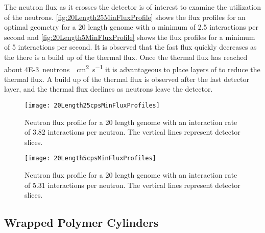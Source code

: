 The neutron flux as it crosses the detector is of interest to examine the utilization of the neutrons.
\autoref{fig:20Length25MinFluxProfile} shows the flux profiles for an optimal geometry for a 20 length genome with a minimum of 2.5 interactions per second and \autoref{fig:20Length5MinFluxProfile} shows the flux profiles for a minimum of 5 interactions per second.
It is observed that the fast flux quickly decreases as the there is a build up of the thermal flux.
Once the thermal flux has reached about \SI{4E-3}{neutrons \per \cm\squared \per\second} it is advantageous to place layers of  to reduce the thermal flux.
A build up of the thermal flux is observed after the last detector layer, and the thermal flux declines as neutrons leave the detector.
\begin{figure}
	\centering
	\texttt{[image: 20Length25cpsMinFluxProfiles]}
	\caption[Neutron Flux Profile for an Optimal 20 Length Genome, minimum 2.5 interactions per second]{Neutron flux profile for a 20 length genome with an interaction rate of 3.82 interactions per neutron. The vertical lines represent detector slices.}
	\label{fig:20Length25MinFluxProfile}
\end{figure}
\begin{figure}
	\centering
	\texttt{[image: 20Length5cpsMinFluxProfiles]}
	\caption[Neutron Flux Profile for an Optimal 20 Length Genome, minimum 5 interactions per second]{Neutron flux profile for a 20 length genome with an interaction rate of 5.31 interactions per neutron. The vertical lines represent detector slices.}
	\label{fig:20Length5MinFluxProfile}
\end{figure}

\subsection{Wrapped Polymer Cylinders}
\label{sec:WrappedCylinders}

